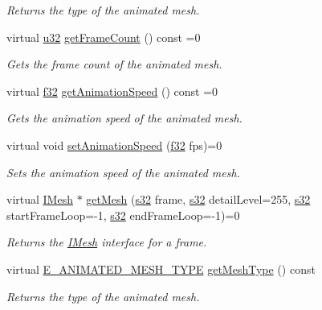 \begin{DoxyCompactItemize}
\begin{DoxyCompactList}\small\item\em Returns the type of the animated mesh. \end{DoxyCompactList}\item 
virtual \hyperlink{namespaceirr_a0416a53257075833e7002efd0a18e804}{u32} \hyperlink{classirr_1_1scene_1_1IAnimatedMesh_a2ec99aba081e9f37802e8ea9cd65629b}{get\+Frame\+Count} () const =0
\begin{DoxyCompactList}\small\item\em Gets the frame count of the animated mesh. \end{DoxyCompactList}\item 
virtual \hyperlink{namespaceirr_a0277be98d67dc26ff93b1a6a1d086b07}{f32} \hyperlink{classirr_1_1scene_1_1IAnimatedMesh_acb4249295319c8240d5bedc167417435}{get\+Animation\+Speed} () const =0
\begin{DoxyCompactList}\small\item\em Gets the animation speed of the animated mesh. \end{DoxyCompactList}\item 
virtual void \hyperlink{classirr_1_1scene_1_1IAnimatedMesh_a5eb1b09d96547dbd273d489e58d62658}{set\+Animation\+Speed} (\hyperlink{namespaceirr_a0277be98d67dc26ff93b1a6a1d086b07}{f32} fps)=0
\begin{DoxyCompactList}\small\item\em Sets the animation speed of the animated mesh. \end{DoxyCompactList}\item 
virtual \hyperlink{classirr_1_1scene_1_1IMesh}{I\+Mesh} $\ast$ \hyperlink{classirr_1_1scene_1_1IAnimatedMesh_adccb39fee83bed36a464cf7b96f3a0ca}{get\+Mesh} (\hyperlink{namespaceirr_ac66849b7a6ed16e30ebede579f9b47c6}{s32} frame, \hyperlink{namespaceirr_ac66849b7a6ed16e30ebede579f9b47c6}{s32} detail\+Level=255, \hyperlink{namespaceirr_ac66849b7a6ed16e30ebede579f9b47c6}{s32} start\+Frame\+Loop=-\/1, \hyperlink{namespaceirr_ac66849b7a6ed16e30ebede579f9b47c6}{s32} end\+Frame\+Loop=-\/1)=0
\begin{DoxyCompactList}\small\item\em Returns the \hyperlink{classirr_1_1scene_1_1IMesh}{I\+Mesh} interface for a frame. \end{DoxyCompactList}\item 
virtual \hyperlink{namespaceirr_1_1scene_a2fc85a64604521ca063f1881b5dd1c61}{E\+\_\+\+A\+N\+I\+M\+A\+T\+E\+D\+\_\+\+M\+E\+S\+H\+\_\+\+T\+Y\+PE} \hyperlink{classirr_1_1scene_1_1IAnimatedMesh_abe5a20eccfb94eefcc6cbbc0b667ce37}{get\+Mesh\+Type} () const
\begin{DoxyCompactList}\small\item\em Returns the type of the animated mesh. \end{DoxyCompactList}\end{DoxyCompactItemize}
